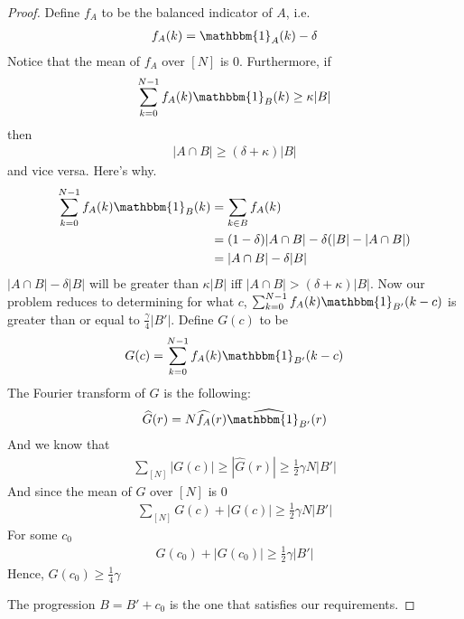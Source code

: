 \documentclass[12pt]{article}
\theoremstyle{definition}
\newcommand{\indi}{\mathbbm{1}}
\begin{document}
\begin{proof}
    Define $f_A$ to be the balanced indicator of $A$, i.e.
    \begin{align*}
        f_A(k) = \indi_A(k) - \delta
    \end{align*}
    Notice that the mean of $f_A$ over $[N]$ is $0$. Furthermore, if 
    \begin{align*} 
        \sum_{k=0}^{N-1} f_A(k) \indi_B(k) \geq \kappa |B|
    \end{align*}
    then
    \begin{align*}
        |A \cap B| \geq \left( \delta + \kappa \right)|B|
    \end{align*}
    and vice versa. Here's why.
    \begin{align*}
        \sum_{k=0}^{N-1} f_A(k) \indi_B(k) &= \sum_{k \in B} f_A(k) \\
        &= (1-\delta)|A \cap B| - \delta (|B| - |A \cap B|) \\
        &= |A \cap B| - \delta |B| 
    \end{align*}
    $|A \cap B| - \delta|B|$ will be greater than $\kappa |B|$ iff $|A \cap B| > (\delta + \kappa)|B|$. Now our problem reduces to determining for what $c$, $\sum_{k=0}^{N-1} f_A(k) \indi_{B'}(k-c)$ is greater than or equal to $\frac{\gamma}{4} |B'|$. Define $G(c)$ to be
    \begin{align*}
        G(c) = \sum_{k=0}^{N-1} f_A(k) \indi_{B'}(k-c)
    \end{align*}
    The Fourier transform of $G$ is the following:
    \begin{align*}
        \widehat{G}(r) = N \widehat{f_A}(r) \widehat{\indi_{B'}}(r)
    \end{align*}
    And we know that
    \begin{align*}
        \sum_{[N]} |G(c)| \geq \left| \widehat{G}(r) \right| \geq \frac{1}{2}\gamma N |B'|
    \end{align*}
    And since the mean of $G$ over $[N]$ is $0$
    \begin{align*}
        \sum_{[N]} G(c) + |G(c)| \geq \frac{1}{2}\gamma N |B'|
    \end{align*}
    For some $c_0$
    \begin{align*}
        G(c_0) + |G(c_0)| \geq \frac{1}{2} \gamma |B'|
    \end{align*}
    Hence, $G(c_0) \geq \frac{1}{4}\gamma$
    
    The progression $B = B' + c_0$ is the one that satisfies our requirements.
\end{proof}
\end{document}
